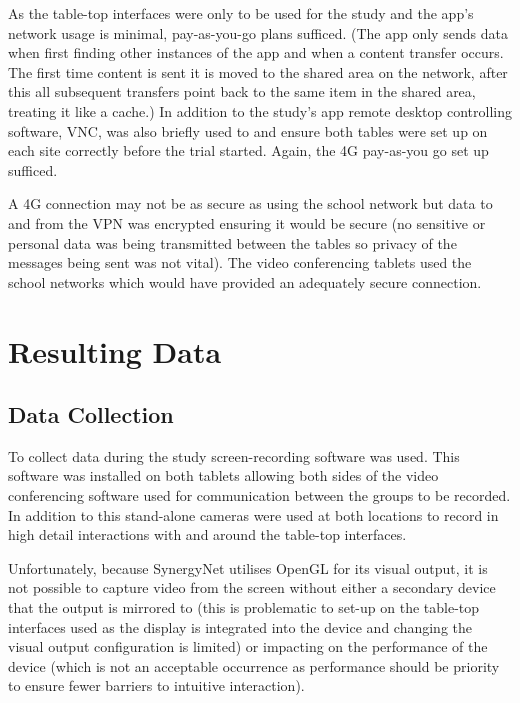 \documentclass[a4paper,11pt]{article}
\begin{document}
As the table-top interfaces were only to be used for the study and the app’s network usage is minimal, pay-as-you-go plans sufficed.
(The app only sends data when first finding other instances of the app and when a content transfer occurs.
The first time content is sent it is moved to the shared area on the network, after this all subsequent transfers point back to the same item in the shared area, treating it like a cache.) In addition to the study’s app remote desktop controlling software, VNC, was also briefly used to and ensure both tables were set up on each site correctly before the trial started.
Again, the 4G pay-as-you go set up sufficed.

A 4G connection may not be as secure as using the school network but data to and from the VPN was encrypted ensuring it would be secure (no sensitive or personal data was being transmitted between the tables so privacy of the messages being sent was not vital).
The video conferencing tablets used the school networks which would have provided an adequately secure connection.


\section{Resulting Data} %

 
\subsection{Data Collection}

To collect data during the study screen-recording software was used.
This software was installed on both tablets allowing both sides of the video conferencing software used for communication between the groups to be recorded.
In addition to this stand-alone cameras were used at both locations to record in high detail interactions with and around the table-top interfaces.

Unfortunately, because SynergyNet utilises OpenGL for its visual output, it is not possible to capture video from the screen without either a secondary device that the output is mirrored to (this is problematic to set-up on the table-top interfaces used as the display is integrated into the device and changing the visual output configuration is limited) or impacting on the performance of the device (which is not an acceptable occurrence as performance should be priority to ensure fewer barriers to intuitive interaction).
\end{document}
